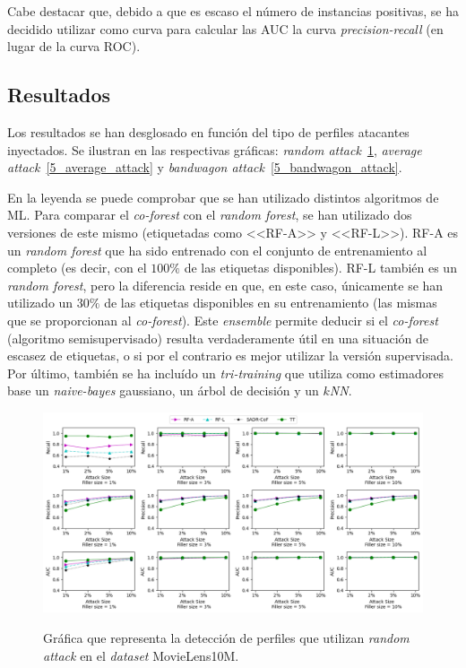 Cabe destacar que, debido a que es escaso el número de instancias positivas, se ha decidido utilizar como curva para calcular las AUC la curva \textit{precision-recall} (en lugar de la curva ROC).

\subsection{Resultados}

Los resultados se han desglosado en función del tipo de perfiles atacantes inyectados. Se ilustran en las respectivas gráficas: \textit{random attack}~\ref{5_random_attack}, \textit{average attack}~\ref{5_average_attack} y \textit{bandwagon attack}~\ref{5_bandwagon_attack}.

En la leyenda se puede comprobar que se han utilizado distintos algoritmos de ML. Para comparar el \textit{co-forest} con el \textit{random forest}, se han utilizado dos versiones de este mismo (etiquetadas como <<RF-A>> y <<RF-L>>). RF-A es un \textit{random forest} que ha sido entrenado con el conjunto de entrenamiento al completo (es decir, con el $100\%$ de las etiquetas disponibles). RF-L también es un \textit{random forest}, pero la diferencia reside en que, en este caso, únicamente se han utilizado un $30\%$ de las etiquetas disponibles en su entrenamiento (las mismas que se proporcionan al \textit{co-forest}). Este \textit{ensemble} permite deducir si el \textit{co-forest} (algoritmo semisupervisado) resulta verdaderamente útil en una situación de escasez de etiquetas, o si por el contrario es mejor utilizar la versión supervisada. Por último, también se ha incluído un \textit{tri-training} que utiliza como estimadores base un \textit{naive-bayes} gaussiano, un árbol de decisión y un \textit{$k$NN}.

\begin{figure}[h]
	\caption[\textit{Random attack}: detección.]{Gráfica que representa la detección de perfiles que utilizan \textit{random attack} en el \textit{dataset} MovieLens10M.}
	\centering
	\includegraphics[scale=0.45]{../img/memoria/5_resultados_random_attack}
	\label{5_random_attack}
\end{figure}

